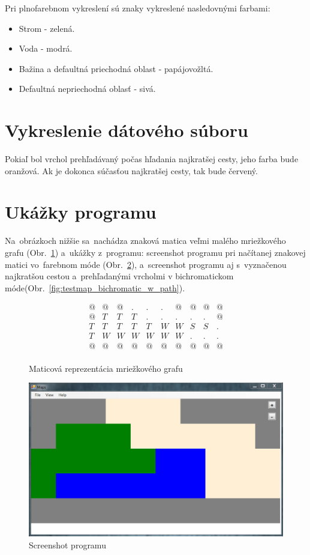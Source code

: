 Pri plnofarebnom vykreslení sú znaky vykreslené nasledovnými farbami:
\begin{itemize}
\item Strom - zelená.
\item Voda - modrá.
\item Bažina a defaultná priechodná oblast - papájovožltá.
\item Defaultná nepriechodná oblasť - sivá.
\end{itemize}


\section{Vykreslenie dátového súboru}
Pokiaľ bol vrchol prehľadávaný počas hľadania najkratšej cesty, jeho farba bude oranžová. Ak je dokonca súčasťou najkratšej cesty, 
tak bude červený.

\section{Ukážky programu}


Na~obrázkoch nižšie sa~nachádza znaková matica veľmi malého mriežkového
 grafu (Obr.~\ref{fig:testmap_znakova_matica}) a~ukážky z~programu:
 screenshot programu pri načítanej znakovej matici vo~farebnom móde (Obr.~\ref{fig:testmap_program_color}),
 a~screenshot programu aj s~vyznačenou najkratšou cestou 
 a~prehľadanými vrcholmi v bichromatickom móde(Obr.~\ref{fig:testmap_bichromatic_w_path}). 


\begin{figure}[h]
\centering
$$
  \begin{matrix}
    @&@&@&.&.&.&@&@&@&@ \\
    @&T&T&T&.&.&.&.&.&@\\
    T&T&T&T&T&W&W&S&S&.\\
    T&W&W&W&W&W&W&.&.&.\\
    @&@&@&@&@&@&@&@&@&@\\
  \end{matrix}
$$

\caption{Maticová reprezentácia mriežkového grafu}
\label{fig:testmap_znakova_matica}
\end{figure}


\begin{figure}[h]
\centering
\includegraphics[width=12cm]{./img/testmap_program_color.png}
\caption{Screenshot programu }
\label{fig:testmap_program_color}
\end{figure}

